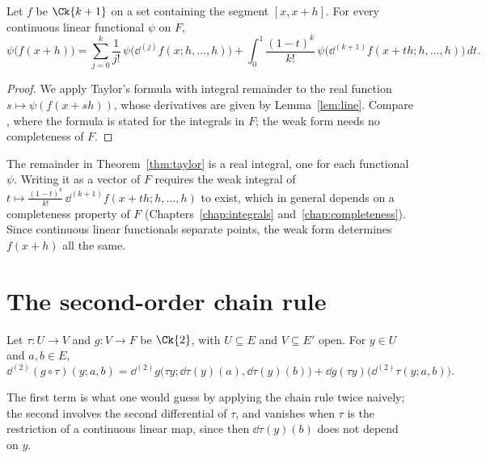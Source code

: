 \begin{theorem}
  \label{thm:taylor}
  \leanok
  Let $f$ be $\Ck{k+1}$ on a set containing the segment $[x, x+h]$. For every continuous linear
  functional $\psi$ on $F$,
  \[
    \psi\bigl(f(x + h)\bigr) = \sum_{j=0}^{k} \frac{1}{j!}\,
      \psi\bigl(\dd^{(j)} f(x; h, \dots, h)\bigr)
      + \int_0^1 \frac{(1-t)^k}{k!}\,
      \psi\bigl(\dd^{(k+1)} f(x + th; h, \dots, h)\bigr)\, dt .
  \]
\end{theorem}

\begin{proof}
  \leanok
  We apply Taylor's formula with integral remainder to the real function
  $s \mapsto \psi(f(x + sh))$, whose derivatives are given by Lemma~\ref{lem:line}. Compare
  \cite[1.6.1 and 1.6.14]{GN26}, where the formula is stated for the integrals in $F$; the weak form
  needs no completeness of $F$.
\end{proof}

\begin{remark}
  The remainder in Theorem~\ref{thm:taylor} is a real integral, one for each functional $\psi$.
  Writing it as a vector of $F$ requires the weak integral of
  $t \mapsto \frac{(1-t)^k}{k!}\,\dd^{(k+1)} f(x + th; h, \dots, h)$ to exist, which in general
  depends on a completeness property of $F$ (Chapters~\ref{chap:integrals}
  and~\ref{chap:completeness}). Since continuous linear functionals separate points, the weak
  form determines $f(x + h)$ all the same.
\end{remark}

\section{The second-order chain rule}

\begin{theorem}
  \label{thm:chain-second}
  \leanok
  Let $\tau \colon U \to V$ and $g \colon V \to F$ be $\Ck{2}$, with $U \subseteq E$ and
  $V \subseteq E'$ open. For $y \in U$ and $a, b \in E$,
  \[
    \dd^{(2)} (g \circ \tau)(y; a, b)
      = \dd^{(2)} g\bigl(\tau y; \dd\tau(y)(a), \dd\tau(y)(b)\bigr)
        + \dd g(\tau y)\bigl(\dd^{(2)} \tau(y; a, b)\bigr).
  \]
\end{theorem}

The first term is what one would guess by applying the chain rule twice naively; the second
involves the second differential of $\tau$, and vanishes when $\tau$ is the restriction of a continuous
linear map, since then $\dd\tau(y)(b)$ does not depend on $y$.

